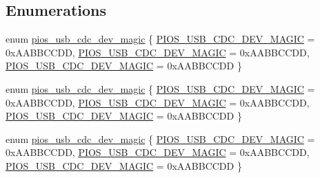 \subsection*{Enumerations}
\begin{DoxyCompactItemize}
\item 
enum \hyperlink{group___p_i_o_s___u_s_b___c_o_m_gab4c476b0e464c59dcf6eadec015a87b8}{pios\-\_\-usb\-\_\-cdc\-\_\-dev\-\_\-magic} \{ \hyperlink{group___p_i_o_s___u_s_b___c_o_m_ggab4c476b0e464c59dcf6eadec015a87b8a41f1698bd0d94e1a4755f2a39d3ce022}{P\-I\-O\-S\-\_\-\-U\-S\-B\-\_\-\-C\-D\-C\-\_\-\-D\-E\-V\-\_\-\-M\-A\-G\-I\-C} = 0x\-A\-A\-B\-B\-C\-C\-D\-D, 
\hyperlink{group___p_i_o_s___u_s_b___c_o_m_ggab4c476b0e464c59dcf6eadec015a87b8a41f1698bd0d94e1a4755f2a39d3ce022}{P\-I\-O\-S\-\_\-\-U\-S\-B\-\_\-\-C\-D\-C\-\_\-\-D\-E\-V\-\_\-\-M\-A\-G\-I\-C} = 0x\-A\-A\-B\-B\-C\-C\-D\-D, 
\hyperlink{group___p_i_o_s___u_s_b___c_o_m_ggab4c476b0e464c59dcf6eadec015a87b8a41f1698bd0d94e1a4755f2a39d3ce022}{P\-I\-O\-S\-\_\-\-U\-S\-B\-\_\-\-C\-D\-C\-\_\-\-D\-E\-V\-\_\-\-M\-A\-G\-I\-C} = 0x\-A\-A\-B\-B\-C\-C\-D\-D
 \}
\item 
enum \hyperlink{group___p_i_o_s___u_s_b___c_o_m_gab4c476b0e464c59dcf6eadec015a87b8}{pios\-\_\-usb\-\_\-cdc\-\_\-dev\-\_\-magic} \{ \hyperlink{group___p_i_o_s___u_s_b___c_o_m_ggab4c476b0e464c59dcf6eadec015a87b8a41f1698bd0d94e1a4755f2a39d3ce022}{P\-I\-O\-S\-\_\-\-U\-S\-B\-\_\-\-C\-D\-C\-\_\-\-D\-E\-V\-\_\-\-M\-A\-G\-I\-C} = 0x\-A\-A\-B\-B\-C\-C\-D\-D, 
\hyperlink{group___p_i_o_s___u_s_b___c_o_m_ggab4c476b0e464c59dcf6eadec015a87b8a41f1698bd0d94e1a4755f2a39d3ce022}{P\-I\-O\-S\-\_\-\-U\-S\-B\-\_\-\-C\-D\-C\-\_\-\-D\-E\-V\-\_\-\-M\-A\-G\-I\-C} = 0x\-A\-A\-B\-B\-C\-C\-D\-D, 
\hyperlink{group___p_i_o_s___u_s_b___c_o_m_ggab4c476b0e464c59dcf6eadec015a87b8a41f1698bd0d94e1a4755f2a39d3ce022}{P\-I\-O\-S\-\_\-\-U\-S\-B\-\_\-\-C\-D\-C\-\_\-\-D\-E\-V\-\_\-\-M\-A\-G\-I\-C} = 0x\-A\-A\-B\-B\-C\-C\-D\-D
 \}
\item 
enum \hyperlink{group___p_i_o_s___u_s_b___c_o_m_gab4c476b0e464c59dcf6eadec015a87b8}{pios\-\_\-usb\-\_\-cdc\-\_\-dev\-\_\-magic} \{ \hyperlink{group___p_i_o_s___u_s_b___c_o_m_ggab4c476b0e464c59dcf6eadec015a87b8a41f1698bd0d94e1a4755f2a39d3ce022}{P\-I\-O\-S\-\_\-\-U\-S\-B\-\_\-\-C\-D\-C\-\_\-\-D\-E\-V\-\_\-\-M\-A\-G\-I\-C} = 0x\-A\-A\-B\-B\-C\-C\-D\-D, 
\hyperlink{group___p_i_o_s___u_s_b___c_o_m_ggab4c476b0e464c59dcf6eadec015a87b8a41f1698bd0d94e1a4755f2a39d3ce022}{P\-I\-O\-S\-\_\-\-U\-S\-B\-\_\-\-C\-D\-C\-\_\-\-D\-E\-V\-\_\-\-M\-A\-G\-I\-C} = 0x\-A\-A\-B\-B\-C\-C\-D\-D, 
\hyperlink{group___p_i_o_s___u_s_b___c_o_m_ggab4c476b0e464c59dcf6eadec015a87b8a41f1698bd0d94e1a4755f2a39d3ce022}{P\-I\-O\-S\-\_\-\-U\-S\-B\-\_\-\-C\-D\-C\-\_\-\-D\-E\-V\-\_\-\-M\-A\-G\-I\-C} = 0x\-A\-A\-B\-B\-C\-C\-D\-D
 \}
\end{DoxyCompactItemize}
